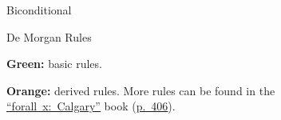 \documentclass[a4paper,10pt]{article}
\begin{document}
\begin{adjustbox}{minipage=[t][\myheight]{.3\linewidth},valign=t}
\begin{formalboxbasic}{Biconditional}
\begin{flusheqs}
\begin{nd}
             
        \end{nd}
        \end{flusheqs}
        \begin{flusheqs}
        \begin{nd}
             
        \end{nd}
        \end{flusheqs}
    \end{formalboxbasic}
    \vfill
    \begin{formalboxderived}{De Morgan Rules}
        \begin{flusheqs}
        \begin{nd}
             
        \end{nd}
        \end{flusheqs}
        \begin{flusheqs}
        \begin{nd}
             
        \end{nd}
        \end{flusheqs}
        \begin{flusheqs}
        \begin{nd}
             
        \end{nd}
        \end{flusheqs}
        \begin{flusheqs}
        \begin{nd}
             
        \end{nd}
        \end{flusheqs}
    \end{formalboxderived}
    \vfill
    \textcolor{colorbasicrule}{\textbf{Green:} basic rules.}\par
    \textcolor{colorderivedrule}{\textbf{Orange:} derived rules.}
    \vfill
    More rules can be found in the \\
    \href{https://forallx.openlogicproject.org}{\enquote{forall~x:~Calgary}} book (\href{https://forallx.openlogicproject.org/forallxyyc.pdf#page=416}{p.~406}).
\end{adjustbox}

\endgroup
\end{document}
